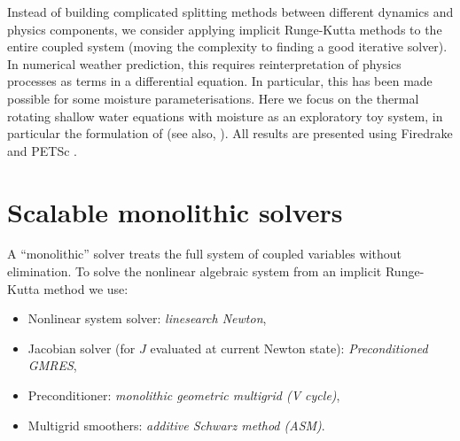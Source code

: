 \documentclass[
]{ImperialPoster}
\begin{document}

\titlesection %

\begin{multicols}{3} %
	

   Instead of building complicated splitting methods between different
   dynamics and physics components, we consider applying implicit
   Runge-Kutta methods to the entire coupled system (moving the
   complexity to finding a good iterative solver). In numerical weather prediction, this
   requires reinterpretation of physics processes as terms in a
   differential equation. In particular, this has been made possible
   for some moisture parameterisations. Here we focus on the thermal
   rotating shallow water equations with moisture as an exploratory
   toy system, in particular the formulation of
   \cite{zerroukat2015moist} (see also, \cite{rostami2018improved}).
   All results are presented using Firedrake \cite{FiredrakeUserManual}
   and PETSc \cite{petsc-user-ref}.
     \vspace{-5mm}
  \section{Scalable monolithic solvers}
  \vspace{-5mm}
  A ``monolithic'' solver treats the full system of coupled variables
  without elimination. To solve the nonlinear algebraic system from an
  implicit Runge-Kutta method we use:
  \begin{itemize}[noitemsep, topsep=0pt]
  \item Nonlinear system solver: \emph{linesearch Newton},
  \item Jacobian solver (for $J$ evaluated at current Newton state):
    \emph{Preconditioned GMRES},
  \item Preconditioner: \emph{monolithic geometric multigrid (V cycle)},
  \item Multigrid smoothers: \emph{additive Schwarz method (ASM)}.
  \end{itemize}


\end{multicols}
\end{document}
